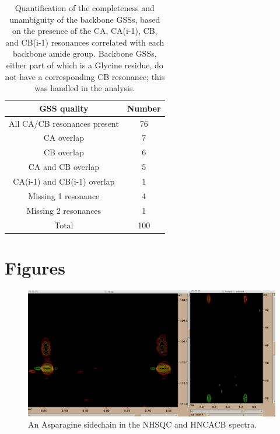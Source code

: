\begin{table}
    \begin{tabular}{ | c | c | }
      \hline
      GSS quality                   &  Number   \\  \hline
      All CA/CB resonances present  &  76       \\  \hline
      CA overlap                    &  7        \\  \hline
      CB overlap                    &  6        \\  \hline
      CA and CB overlap             &  5        \\  \hline
      CA(i-1) and CB(i-1) overlap   &  1        \\  \hline
      Missing 1 resonance           &  4        \\  \hline
      Missing 2 resonances          &  1        \\  \hline \hline
      Total                         &  100      \\  \hline
    \end{tabular}
    \caption[Quantification of the completeness and unambiguity of the backbone GSSs.]
            {Quantification of the completeness and unambiguity of the backbone GSSs,
             based on the presence of the CA, CA(i-1), CB, and CB(i-1) resonances
             correlated with each backbone amide group.  Backbone GSSs, either
             part of which is a Glycine residue, do not have a corresponding
             CB resonance; this was handled in the analysis.}
    \label{backbone_gss_quality}
\end{table}


\clearpage
\section{Figures}

\begin{figure}[h]
  \includegraphics[scale=0.25]{figures/asn_sidechain}
  \caption{An Asparagine sidechain in the NHSQC and HNCACB spectra.}
  \label{asn_sidechain}
\end{figure}


